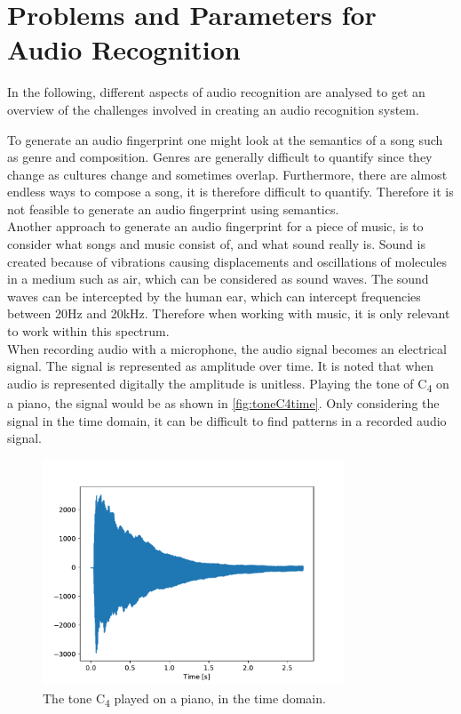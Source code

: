 \section{Problems and Parameters for Audio Recognition}
\label{sec:ParametersAudioRecognition}
In the following, different aspects of audio recognition are analysed to get an overview of the challenges involved in creating an audio recognition system.

To generate an audio fingerprint one might look at the semantics of a song such as genre and composition. Genres are generally difficult to quantify since they change as cultures change and sometimes overlap. Furthermore, there are almost endless ways to compose a song, it is therefore difficult to quantify. Therefore it is not feasible to generate an audio fingerprint using semantics. \cite{haitsma2003highly}\\
Another approach to generate an audio fingerprint for a piece of music, is to consider what songs and music consist of, and what sound really is.
Sound is created because of vibrations causing displacements and oscillations of molecules in a medium such as air, which can be considered as sound waves. The sound waves can be intercepted by the human ear, which can intercept frequencies between 20Hz and 20kHz. Therefore when working with music, it is only relevant to work within this spectrum. \cite[21]{Meinard2015Fundamentals}\\

When recording audio with a microphone, the audio signal becomes an electrical signal. The signal is represented as amplitude over time. It is noted that when audio is represented digitally the amplitude is unitless. Playing the tone of C\textsubscript{4} on a piano, the signal would be as shown in \autoref{fig:toneC4time}. Only considering the signal in the time domain, it can be difficult to find patterns in a recorded audio signal. 

\begin{figure}[H]
    \centering
    \includegraphics[width=0.8\textwidth]{figures/C4audio.pdf}
    \caption{The tone C\textsubscript{4} played on a piano, in the time domain.}
    \label{fig:toneC4time}
\end{figure}

